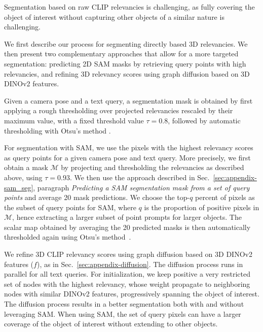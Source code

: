 Segmentation based on raw CLIP relevancies is challenging, as fully covering the object of interest without capturing other objects of a similar nature is challenging.

We first describe our process for segmenting directly based 3D relevancies. We then present two complementary approaches that allow for a more targeted segmentation: predicting 2D SAM masks by retrieving query points with high relevancies, and refining 3D relevancy scores using graph diffusion based on 3D DINOv2 features.

Given a camera pose and a text query, a segmentation mask is obtained by first applying a rough thresholding over projected relevancies rescaled by their maximum value, with a fixed threshold value $\tau=0.8$, followed by automatic thresholding with Otsu's method \citep{otsu1975threshold}.

For segmentation with SAM, we use the pixels with the highest relevancy scores as query points for a given camera pose and text query. 
More precisely, we first obtain a mask $\mathcal{M}$ by projecting and thresholding the relevancies as described above, using $\tau=0.93$. We then use the approach described in Sec.~\ref{sec:appendix-sam_seg}, paragraph \emph{Predicting a SAM segmentation mask from a set of query points} and average 20 mask predictions.
We choose the top-$q$ percent of pixels as the subset of query points for SAM, where $q$ is the proportion of positive pixels in $\mathcal{M}$, hence extracting a larger subset of point prompts for larger objects. The scalar map obtained by averaging the 20 predicted masks is then automatically thresholded again using Otsu's method~\citep{otsu1975threshold}.

We refine 3D CLIP relevancy scores using graph diffusion based on 3D DINOv2 features ($f$), as in Sec.~\ref{sec:appendix-diffusion}. The diffusion process runs in parallel for all text queries. For initialization, we keep positive a very restricted set of nodes with the highest relevancy, whose weight propagate to neighboring nodes with similar DINOv2 features, progressively spanning the object of interest. The diffusion process results in a better segmentation both with and without leveraging SAM. When using SAM, the set of query pixels can have a larger coverage of the object of interest without extending to other objects.

